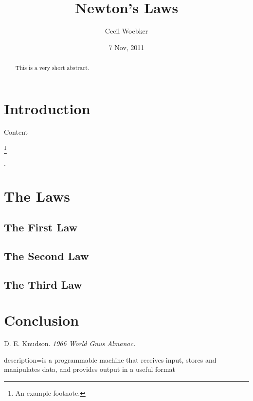 \documentclass[titlepage]{article}
\title{Newton's Laws}
\author{Cecil Woebker}
\date{7 Nov, 2011}
\begin{document}
\maketitle

\begin{abstract}
This is a very short abstract.
\end{abstract}

\printindex

\section{Introduction}

Content

\footnote{An example footnote.}

\cite{kn:gnus}.

\section{The Laws}

\subsection{The First Law}

\subsection{The Second Law}

\subsection{The Third Law}


\section{Conclusion}

\begin{thebibliography}{99}
 D. E. Knudson. {\em 1966 World Gnus Almanac.}
\end{thebibliography}

{
  description={is a programmable machine that receives input,
               stores and manipulates data, and provides
               output in a useful format}
}

\printglossaries
\end{document}
